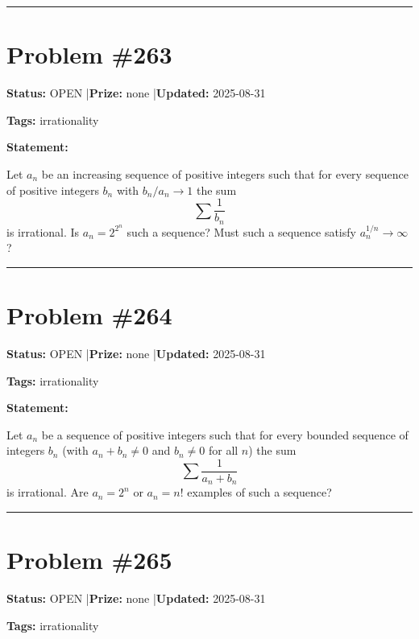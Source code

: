 \documentclass{article}
\begin{document}
\noindent\rule{\linewidth}{0.4pt}


\section{Problem \#263}
\label{prob:263}

\noindent\textbf{Status:} OPEN \quad|\quad \textbf{Prize:} none \quad|\quad \textbf{Updated:} 2025-08-31

\noindent\textbf{Tags:} irrationality

\medskip

\noindent\textbf{Statement:}

Let $a_n$ be an increasing sequence of positive integers such that for every sequence of positive integers $b_n$ with $b_n/a_n\to 1$ the sum\[\sum\frac{1}{b_n}\]is irrational. Is $a_n=2^{2^n}$ such a sequence? Must such a sequence satisfy $a_n^{1/n}\to \infty$?

\noindent\rule{\linewidth}{0.4pt}


\section{Problem \#264}
\label{prob:264}

\noindent\textbf{Status:} OPEN \quad|\quad \textbf{Prize:} none \quad|\quad \textbf{Updated:} 2025-08-31

\noindent\textbf{Tags:} irrationality

\medskip

\noindent\textbf{Statement:}

Let $a_n$ be a sequence of positive integers such that for every bounded sequence of integers $b_n$ (with $a_n+b_n\neq 0$ and $b_n\neq 0$ for all $n$) the sum\[\sum \frac{1}{a_n+b_n}\]is irrational. Are $a_n=2^n$ or $a_n=n!$ examples of such a sequence?

\noindent\rule{\linewidth}{0.4pt}


\section{Problem \#265}
\label{prob:265}

\noindent\textbf{Status:} OPEN \quad|\quad \textbf{Prize:} none \quad|\quad \textbf{Updated:} 2025-08-31

\noindent\textbf{Tags:} irrationality
\end{document}

